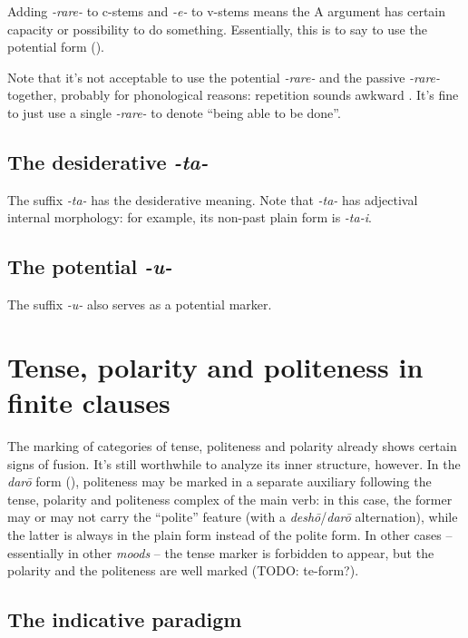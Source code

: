 \documentclass[UTF8, a4paper, oneside, scheme=plain]{ctexrep}
\newcommand{\corpus}[1]{\emph{#1}}
\begin{document}
Adding \corpus{-rare-} to c-stems and \corpus{-e-} to v-stems 
means the A argument has certain capacity or possibility to do something.
Essentially, this is to say to use the potential form ().

Note that it's not acceptable to use the potential \corpus{-rare-} and the passive \corpus{-rare-} together,
probably for phonological reasons: repetition sounds awkward \citep{kuno1978japanese}.
It's fine to just use a single \corpus{-rare-} to denote ``being able to be done''.

\subsection{The desiderative \corpus{-ta-}}

The suffix \corpus{-ta-} has the desiderative meaning.
Note that \corpus{-ta-} has adjectival internal morphology:
for example, its non-past plain form is \corpus{-ta-i}.

\subsection{The potential \corpus{-u-}}

The suffix \corpus{-u-} also serves as a potential marker.

\section{Tense, polarity and politeness in finite clauses}\label{sec:tense-polarity-polite}

The marking of categories of tense, politeness and polarity 
already shows certain signs of fusion.
It's still worthwhile to analyze its inner structure, however.
In the \corpus{dar\={o}} form (),
politeness may be marked in a separate auxiliary following 
the tense, polarity and politeness complex of the main verb:
in this case, the former may or may not carry the ``polite'' feature
(with a \corpus{desh\={o}}/\corpus{dar\={o}} alternation),
while the latter is always in the plain form instead of the polite form.
In other cases -- essentially in other \emph{moods} -- the tense marker is forbidden to appear,
but the polarity and the politeness are well marked (TODO: te-form?).

\subsection{The indicative paradigm}\label{sec:indicative-paradigm}
\end{document}
